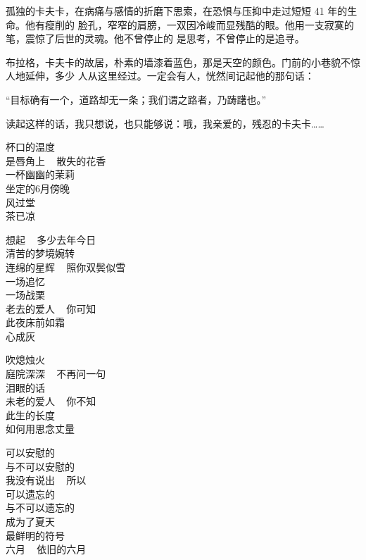 		孤独的卡夫卡，在病痛与感情的折磨下思索，在恐惧与压抑中走过短短 41 年的生命。他有瘦削的
	脸孔，窄窄的肩膀，一双因冷峻而显残酷的眼。他用一支寂寞的笔，震惊了后世的灵魂。他不曾停止的
	是思考，不曾停止的是追寻。

		布拉格，卡夫卡的故居，朴素的墙漆着蓝色，那是天空的颜色。门前的小巷貌不惊人地延伸，多少
	人从这里经过。一定会有人，恍然间记起他的那句话：

		“目标确有一个，道路却无一条；我们谓之路者，乃踌躇也。”

		读起这样的话，我只想说，也只能够说：哦，我亲爱的，残忍的卡夫卡……

	\endwriting


	\longpoem{}{}{}

		杯口的温度 \\
		是唇角上 ~ 散失的花香 \\
		一杯幽幽的茉莉 \\
		坐定的6月傍晚 \\
		风过堂 \\
		茶已凉

		想起 ~ 多少去年今日 \\
		清苦的梦境婉转 \\
		连绵的星辉 ~ 照你双鬓似雪 \\
		一场追忆 \\
		一场战栗 \\
		老去的爱人 ~ 你可知 \\
		此夜床前如霜 \\
		心成灰

		吹熄烛火 \\
		庭院深深 ~ 不再问一句 \\
		泪眼的话 \\
		未老的爱人 ~ 你不知 \\
		此生的长度 \\
		如何用思念丈量

	\endlongpoem
	\endwriting


	\longpoem{}{}{}

		可以安慰的 \\
		与不可以安慰的 \\
		我没有说出 ~ 所以 \\
		可以遗忘的 \\
		与不可以遗忘的 \\
		成为了夏天 \\
		最鲜明的符号 \\
		六月 ~ 依旧的六月

